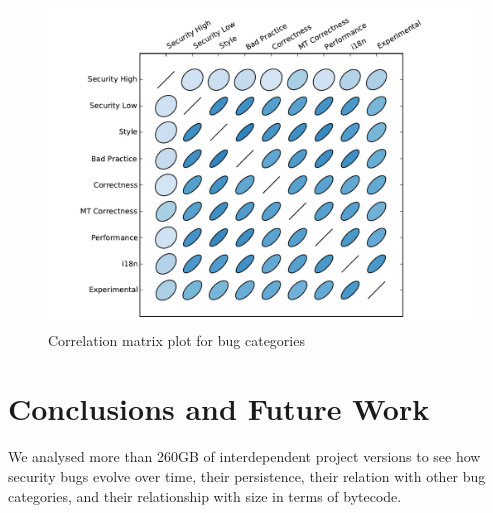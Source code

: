 \documentclass{sig-alternate}
\begin{document}
%    

\begin{figure}[t]
  \centering
  \includegraphics[scale=0.47]{corrplot.pdf}
  \caption{Correlation matrix plot for bug categories}
  \label{fig:corrplot}
\end{figure}

\section{Conclusions and Future Work}
\label{sec:con}

We analysed more than 260GB of interdependent project versions to see
how security bugs evolve over time, their persistence, their relation
with other bug categories, and their relationship with size in terms
of bytecode.
\end{document}
